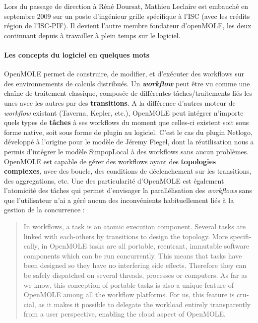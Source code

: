 Lors du passage de direction à Réné Doursat, Mathieu Leclaire est embauché en septembre 2009 sur un poste d'ingénieur grille spécifique à l'ISC (avec les crédits région de l'ISC-PIF). Il devient l'autre membre fondateur d'openMOLE, les deux continuant depuis à travailler à plein temps sur le logiciel.

\paragraph {Les concepts du logiciel en quelques mots}

OpenMOLE permet de construire, de modifier, et d'exécuter des workflows sur des environnements de calculs distribués. Un \textbf{\textit{workflow}} peut être vu comme une chaîne de traitement classique, composée de différentes tâches/traitements liés les unes avec les autres par des \textbf{transitions}. A la différence d'autres moteur de \textit{workflow} existant (Taverna, Kepler, etc.), OpenMOLE peut intégrer n'importe quels types de \textbf{tâches} à ses workflows du moment que celles-ci existent soit sous forme native, soit sous forme de plugin au logiciel. C'est le cas du plugin Netlogo, développé à l'origine pour le modèle de Jéremy Fiegel, dont la réutilisation nous a permis d'intégrer le modèle SimpopLocal à des workflows sans aucun problèmes. OpenMOLE est capable de gérer des workflows ayant des \textbf{topologies complexes}, avec des boucle, des conditions de déclenchement sur les transitions, des aggregations, etc. Une des particularité d'OpenMOLE est également l'atomicité des tâches qui permet d'envisager la parallélisation des \textit{workflows} sans que l'utilisateur n'ai a géré aucun des inconvénients habituellement liés à la gestion de la concurrence :

\foreignblockquote{english}[{\cite[7]{Reuillon2013}}]{In workflows, a task is an atomic execution component. Several tasks are linked with each-others by transitions to design the topology. More specifically, in OpenMOLE tasks are all portable, reentrant, immutable software components which can be run concurrently. This means that tasks have been designed so they have no interfering side effects. Therefore they can be safely dispatched on several threads, processes or computers. As far as we know, this conception of portable tasks is also a unique feature of OpenMOLE among all the workflow platforms. For us, this feature is crucial, as it makes it possible to delegate the workload entirely transparently from a user perspective, enabling the cloud aspect of OpenMOLE.}

